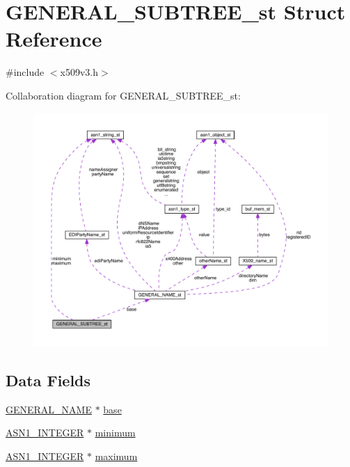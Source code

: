 \hypertarget{struct_g_e_n_e_r_a_l___s_u_b_t_r_e_e__st}{}\section{G\+E\+N\+E\+R\+A\+L\+\_\+\+S\+U\+B\+T\+R\+E\+E\+\_\+st Struct Reference}
\label{struct_g_e_n_e_r_a_l___s_u_b_t_r_e_e__st}


{\ttfamily \#include $<$x509v3.\+h$>$}



Collaboration diagram for G\+E\+N\+E\+R\+A\+L\+\_\+\+S\+U\+B\+T\+R\+E\+E\+\_\+st\+:\nopagebreak
\begin{figure}[H]
\begin{center}
\leavevmode
\includegraphics[width=350pt]{struct_g_e_n_e_r_a_l___s_u_b_t_r_e_e__st__coll__graph}
\end{center}
\end{figure}
\subsection*{Data Fields}
\begin{DoxyCompactItemize}
\item 
\hyperlink{crypto_2x509v3_2x509v3_8h_a6688fb8a0c7b8e63f3d47bac3a09eb15}{G\+E\+N\+E\+R\+A\+L\+\_\+\+N\+A\+ME} $\ast$ \hyperlink{struct_g_e_n_e_r_a_l___s_u_b_t_r_e_e__st_a14f134807ede76c5a1a8643b3fdcdb5a}{base}
\item 
\hyperlink{crypto_2ossl__typ_8h_af4335399bf9774cb410a5e93de65998b}{A\+S\+N1\+\_\+\+I\+N\+T\+E\+G\+ER} $\ast$ \hyperlink{struct_g_e_n_e_r_a_l___s_u_b_t_r_e_e__st_a8c928e7cf26fef65fcff9689c40d6ad9}{minimum}
\item 
\hyperlink{crypto_2ossl__typ_8h_af4335399bf9774cb410a5e93de65998b}{A\+S\+N1\+\_\+\+I\+N\+T\+E\+G\+ER} $\ast$ \hyperlink{struct_g_e_n_e_r_a_l___s_u_b_t_r_e_e__st_a0b61f3bba3ce191a5fc7b6e2965e7e07}{maximum}
\end{DoxyCompactItemize}


